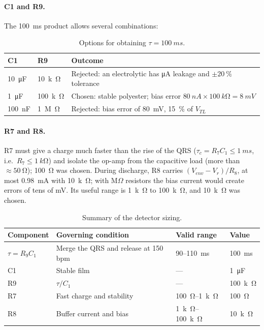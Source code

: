 \documentclass[11pt,letterpaper]{article}
\newcommand{\Vr}{V_r}
\newcommand{\Venv}{V_{env}}
\newcommand{\VTL}{V_{TL}}
\begin{document}
\paragraph{C1 and R9.} The \SI{100}{ms} product allows several combinations:

\begin{table}[H]
\centering
\caption{Options for obtaining $\tau=\SI{100}{ms}$.}\label{tab:c1r9}
\begin{tabularx}{\linewidth}{@{}llX@{}}
\toprule
C1 & R9 & Outcome \\
\midrule
\SI{10}{\micro F} & \SI{10}{k\ohm} & Rejected: an electrolytic has \si{\micro A} leakage and $\pm\SI{20}{\percent}$ tolerance \\
\SI{1}{\micro F} & \SI{100}{k\ohm} & Chosen: stable polyester; bias error $\SI{80}{nA}\times\SI{100}{k\ohm}=\SI{8}{mV}$ \\
\SI{100}{nF} & \SI{1}{M\ohm} & Rejected: bias error of \SI{80}{mV}, \SI{15}{\percent} of $\VTL$ \\
\bottomrule
\end{tabularx}
\end{table}

\paragraph{R7 and R8.} R7 must give a charge much faster than the rise of the QRS ($\tau_c=R_7C_1\le\SI{1}{ms}$, i.e.\ $R_7\le\SI{1}{k\ohm}$) and isolate the op-amp from the capacitive load (more than $\approx\SI{50}{\ohm}$); \SI{100}{\ohm} was chosen. During discharge, R8 carries $(\Venv-\Vr)/R_8$, at most \SI{0.98}{mA} with \SI{10}{k\ohm}; with M$\Omega$ resistors the bias current would create errors of tens of mV. Its useful range is \SI{1}{k\ohm} to \SI{100}{k\ohm}, and \SI{10}{k\ohm} was chosen.

\begin{table}[H]
\centering
\caption{Summary of the detector sizing.}\label{tab:res3}
\begin{tabular}{@{}llll@{}}
\toprule
Component & Governing condition & Valid range & Value \\
\midrule
$\tau=R_9C_1$ & Merge the QRS and release at 150 bpm & 90--\SI{110}{ms} & \SI{100}{ms} \\
C1 & Stable film & --- & \SI{1}{\micro F} \\
R9 & $\tau/C_1$ & --- & \SI{100}{k\ohm} \\
R7 & Fast charge and stability & \SI{100}{\ohm}--\SI{1}{k\ohm} & \SI{100}{\ohm} \\
R8 & Buffer current and bias & \SI{1}{k\ohm}--\SI{100}{k\ohm} & \SI{10}{k\ohm} \\
\bottomrule
\end{tabular}
\end{table}
\end{document}
